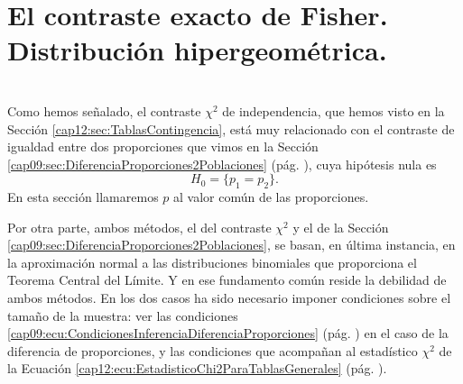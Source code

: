 \section{El contraste exacto  de Fisher. Distribución hipergeométrica.}
\label{cap12:sec:ContrasteFisher}
\\

Como hemos señalado, el contraste $\chi^2$ de independencia, que hemos visto en la Sección \ref{cap12:sec:TablasContingencia}, está muy relacionado con el contraste de igualdad entre dos proporciones que vimos en la Sección \ref{cap09:sec:DiferenciaProporciones2Poblaciones} (pág. \pageref{cap09:sec:DiferenciaProporciones2Poblaciones}), cuya hipótesis nula es
\[H_0=\{p_1=p_2\}.\]
En esta sección llamaremos $p$ al valor común de las proporciones.

Por otra parte, ambos métodos, el del contraste $\chi^2$ y el de la Sección \ref{cap09:sec:DiferenciaProporciones2Poblaciones}, se basan, en última instancia, en la aproximación normal a las distribuciones binomiales que proporciona el Teorema Central del Límite. Y en ese fundamento común reside la debilidad de ambos métodos. En los dos casos ha sido necesario imponer condiciones sobre el tamaño de la muestra: ver las condiciones \ref{cap09:ecu:CondicionesInferenciaDiferenciaProporciones} (pág. \pageref{cap09:ecu:CondicionesInferenciaDiferenciaProporciones}) en el caso de la diferencia de proporciones, y las condiciones que acompañan al estadístico $\chi^2$ de la Ecuación \ref{cap12:ecu:EstadisticoChi2ParaTablasGenerales} (pág. \pageref{cap12:ecu:EstadisticoChi2ParaTablasGenerales}).

